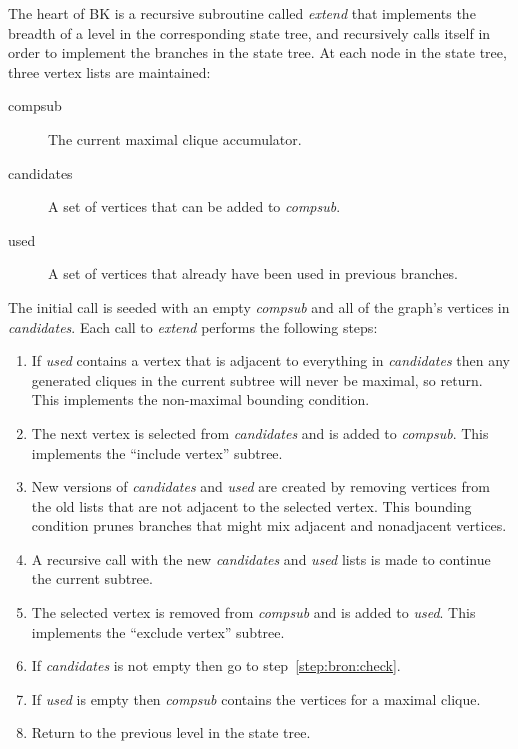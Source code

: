 The heart of BK is a recursive subroutine called \emph{extend} that implements the breadth of a level in the
corresponding state tree, and recursively calls itself in order to implement the branches in the state tree.
At each node in the state tree, three vertex lists are maintained:

\begin{description}
\item[compsub] The current maximal clique accumulator.
\item[candidates] A set of vertices that can be added to \emph{compsub}.
\item[used] A set of vertices that already have been used in previous branches.
\end{description}

The initial call is seeded with an empty \emph{compsub} and all of the graph's vertices in \emph{candidates}.  Each
call to \emph{extend} performs the following steps:
\begin{enumerate}
\item\label{step:bron:check} If \emph{used} contains a vertex that is adjacent to everything in \emph{candidates}
  then any generated cliques in the current subtree will never be maximal, so return.  This implements the
  non-maximal bounding condition.
\item\label{step:bron:select} The next vertex is selected from \emph{candidates} and is added to \emph{compsub}.
  This implements the ``include vertex'' subtree.
\item\label{step:bron:recalc} New versions of \emph{candidates} and \emph{used} are created by removing vertices
  from the old lists that are not adjacent to the selected vertex.  This bounding condition prunes branches that
  might mix adjacent and nonadjacent vertices.
\item\label{step:bron:branch} A recursive call with the new \emph{candidates} and \emph{used} lists is made to
  continue the current subtree.
\item\label{step:bron:used} The selected vertex is removed from \emph{compsub} and is added to \emph{used}.  This
  implements the ``exclude vertex'' subtree.
\item\label{step:bron:leaf} If \emph{candidates} is not empty then go to step~\ref{step:bron:check}.
\item\label{step:bron:done} If \emph{used} is empty then \emph{compsub} contains the vertices for a maximal clique.
\item\label{step:bron:return} Return to the previous level in the state tree.
\end{enumerate}

